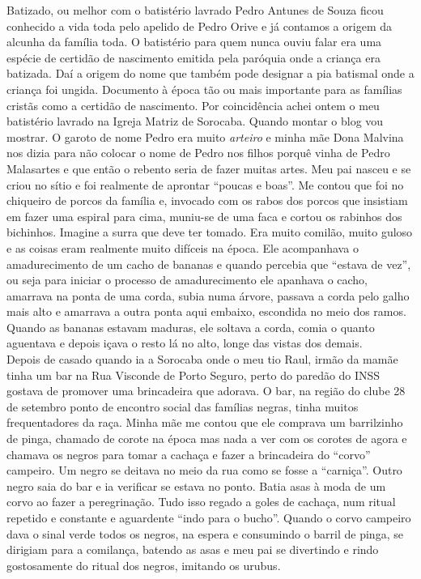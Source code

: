 \documentclass[12pt,brazil,]{book}
\begin{document}
Batizado, ou melhor com o batistério lavrado Pedro Antunes de Souza
ficou conhecido a vida toda pelo apelido de Pedro Orive e já contamos a
origem da alcunha da família toda. O batistério para quem nunca ouviu
falar era uma espécie de certidão de nascimento emitida pela paróquia
onde a criança era batizada. Daí a origem do nome que também pode
designar a pia batismal onde a criança foi ungida. Documento à época tão
ou mais importante para as famílias cristãs como a certidão de
nascimento. Por coincidência achei ontem o meu batistério lavrado na
Igreja Matriz de Sorocaba. Quando montar o blog vou mostrar. O garoto de
nome Pedro era muito \emph{arteiro} e minha mãe Dona Malvina nos dizia
para não colocar o nome de Pedro nos filhos porquê vinha de Pedro
Malasartes e que então o rebento seria de fazer muitas artes. Meu pai
nasceu e se criou no sítio e foi realmente de aprontar ``poucas e
boas''. Me contou que foi no chiqueiro de porcos da família e, invocado
com os rabos dos porcos que insistiam em fazer uma espiral para cima,
muniu-se de uma faca e cortou os rabinhos dos bichinhos. Imagine a surra
que deve ter tomado. Era muito comilão, muito guloso e as coisas eram
realmente muito difíceis na época. Ele acompanhava o amadurecimento de
um cacho de bananas e quando percebia que ``estava de vez'', ou seja
para iniciar o processo de amadurecimento ele apanhava o cacho, amarrava
na ponta de uma corda, subia numa árvore, passava a corda pelo galho
mais alto e amarrava a outra ponta aqui embaixo, escondida no meio dos
ramos. Quando as bananas estavam maduras, ele soltava a corda, comia o
quanto aguentava e depois içava o resto lá no alto, longe das vistas dos
demais.\\
Depois de casado quando ia a Sorocaba onde o meu tio Raul, irmão da
mamãe tinha um bar na Rua Visconde de Porto Seguro, perto do paredão do
INSS gostava de promover uma brincadeira que adorava. O bar, na região
do clube 28 de setembro ponto de encontro social das famílias negras,
tinha muitos frequentadores da raça. Minha mãe me contou que ele
comprava um barrilzinho de pinga, chamado de corote na época mas nada a
ver com os corotes de agora e chamava os negros para tomar a cachaça e
fazer a brincadeira do ``corvo'' campeiro. Um negro se deitava no meio
da rua como se fosse a ``carniça''. Outro negro saia do bar e ia
verificar se estava no ponto. Batia asas à moda de um corvo ao fazer a
peregrinação. Tudo isso regado a goles de cachaça, num ritual repetido e
constante e aguardente ``indo para o bucho''. Quando o corvo campeiro
dava o sinal verde todos os negros, na espera e consumindo o barril de
pinga, se dirigiam para a comilança, batendo as asas e meu pai se
divertindo e rindo gostosamente do ritual dos negros, imitando os
urubus.
\end{document}
